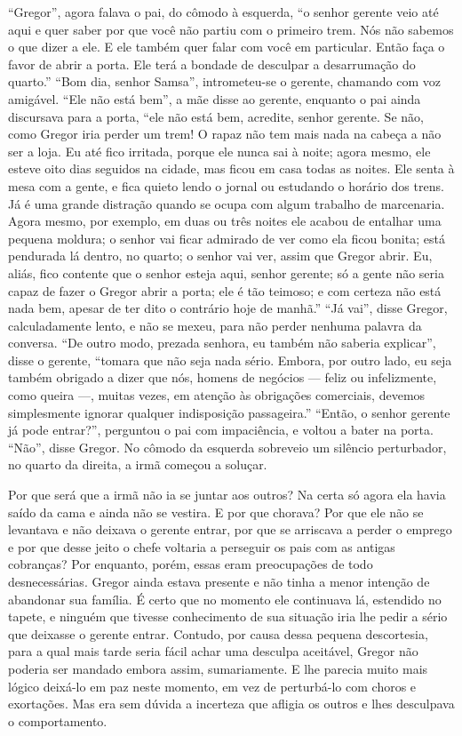 “Gregor”, agora falava o pai, do cômodo à esquerda, “o senhor gerente veio
até aqui e quer saber por que você não partiu com o primeiro trem. Nós não
sabemos o que dizer a ele. E ele também quer falar com você em particular.
Então faça o favor de abrir a porta. Ele terá a bondade de desculpar a
desarrumação do quarto.” “Bom dia, senhor Samsa”, intrometeu-se o gerente,
chamando com voz amigável. “Ele não está bem”, a mãe disse ao gerente,
enquanto o pai ainda discursava para a porta, “ele não está bem, acredite,
senhor gerente. Se não, como Gregor iria perder um trem! O rapaz não tem
mais nada na cabeça a não ser a loja. Eu até fico irritada, porque ele
nunca sai à noite; agora mesmo, ele esteve oito dias seguidos na cidade,
mas ficou em casa todas as noites. Ele senta à mesa com a gente, e fica
quieto lendo o jornal ou estudando o horário dos trens. Já é uma grande
distração quando se ocupa com algum trabalho de marcenaria. Agora mesmo,
por exemplo, em duas ou três noites ele acabou de entalhar uma pequena
moldura; o senhor vai ficar admirado de ver como ela ficou bonita; está
pendurada lá dentro, no quarto; o senhor vai ver, assim que Gregor abrir.
Eu, aliás, fico contente que o senhor esteja aqui, senhor gerente; só a
gente não seria capaz de fazer o Gregor abrir a porta; ele é tão teimoso;
e com certeza não está nada bem, apesar de ter dito o contrário hoje de
manhã.” “Já vai”, disse Gregor, calculadamente lento, e não se mexeu, para
não perder nenhuma palavra da conversa. “De outro modo, prezada senhora,
eu também não saberia explicar”, disse o gerente, “tomara que não seja
nada sério. Embora, por outro lado, eu seja também obrigado a dizer que
nós, homens de negócios --- feliz ou infelizmente, como queira ---, muitas
vezes, em atenção às obrigações comerciais, devemos simplesmente ignorar
qualquer indisposição passageira.” “Então, o senhor gerente já pode
entrar?”, perguntou o pai com impaciência, e voltou a bater na porta.
“Não”, disse Gregor. No cômodo da esquerda sobreveio um silêncio
perturbador, no quarto da direita, a irmã começou a soluçar.

Por que será que a irmã não ia se juntar aos outros? Na certa só agora ela
havia saído da cama e ainda não se vestira. E por que chorava? Por que ele
não se levantava e não deixava o gerente entrar, por que se arriscava a
perder o emprego e por que desse jeito o chefe voltaria a perseguir os pais
com as antigas cobranças? Por enquanto, porém, essas eram preocupações de
todo desnecessárias. Gregor ainda estava presente e não tinha a menor
intenção de abandonar sua família. É certo que no momento ele continuava
lá, estendido no tapete, e ninguém que tivesse conhecimento de sua
situação iria lhe pedir a sério que deixasse o gerente entrar. Contudo,
por causa dessa pequena descortesia, para a qual mais tarde seria fácil
achar uma desculpa aceitável, Gregor não poderia ser mandado embora assim,
sumariamente. E lhe parecia muito mais lógico deixá-lo em paz
neste momento, em vez de perturbá-lo com choros e exortações. Mas era sem
dúvida a incerteza que afligia os outros e lhes desculpava o
comportamento.


